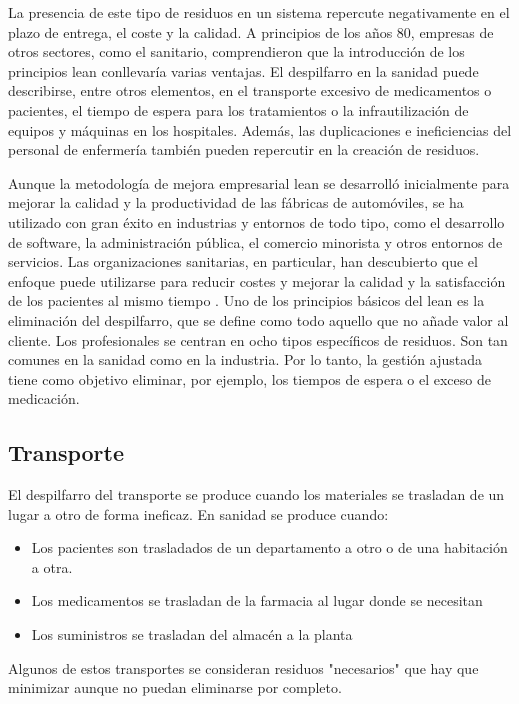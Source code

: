 La presencia de este tipo de residuos en un sistema repercute negativamente en el plazo de entrega, el coste y la calidad.
A principios de los años 80, empresas de otros sectores, como el sanitario, comprendieron que la introducción de los principios lean conllevaría varias ventajas.
El despilfarro en la sanidad puede describirse, entre otros elementos, en el transporte excesivo de medicamentos o pacientes, el tiempo de espera para los tratamientos o la infrautilización de equipos y máquinas en los hospitales. Además, las duplicaciones e ineficiencias del personal de enfermería también pueden repercutir en la creación de residuos.

Aunque la metodología de mejora empresarial lean se desarrolló inicialmente para mejorar la calidad y la productividad de las fábricas de automóviles, se ha utilizado con gran éxito en industrias y entornos de todo tipo, como el desarrollo de software, la administración pública, el comercio minorista y otros entornos de servicios.
Las organizaciones sanitarias, en particular, han descubierto que el enfoque puede utilizarse para reducir costes y mejorar la calidad y la satisfacción de los pacientes al mismo tiempo \cite{millard_how_nodate}.
Uno de los principios básicos del lean es la eliminación del despilfarro, que se define como todo aquello que no añade valor al cliente.
Los profesionales se centran en ocho tipos específicos de residuos.
Son tan comunes en la sanidad como en la industria.
Por lo tanto, la gestión ajustada tiene como objetivo eliminar, por ejemplo, los tiempos de espera o el exceso de medicación.

\subsection{Transporte}

El despilfarro del transporte se produce cuando los materiales se trasladan de un lugar a otro de forma ineficaz. En sanidad se produce cuando:

\begin{itemize}
    \item Los pacientes son trasladados de un departamento a otro o de una habitación a otra.
    \item Los medicamentos se trasladan de la farmacia al lugar donde se necesitan
    \item Los suministros se trasladan del almacén a la planta
\end{itemize}

Algunos de estos transportes se consideran residuos "necesarios" que hay que minimizar aunque no puedan eliminarse por completo.


